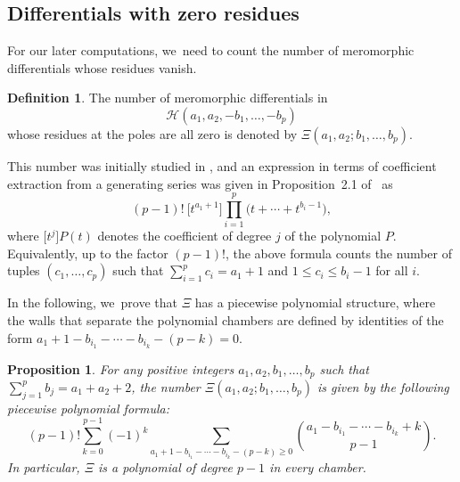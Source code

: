 \documentclass[JEP,XML,SOM,Unicode,NoFloatCountersInSection,published]{cedram}
\newcommand\calH{{\mathcal H}}
\newtheorem{prop}[thm]{Proposition}
\theoremstyle{definition}
\newtheorem{defn}[thm]{Definition}
\begin{document}
\subsection{Differentials with zero residues}\label{sub:counting}

For our later computations, we~need to count the number of meromorphic differentials whose residues vanish.
\begin{defn}\label{def:residuless}
The number of meromorphic differentials in
\[
\calH(a_{1},a_{2},-b_{1},\dots,-b_{p})
\]
whose residues at the poles are all zero is denoted by $\Xi(a_{1},a_{2};b_{1},\dots,b_{p})$.
\end{defn}
This number was initially studied in \cite{EMZ}, and an expression in terms of coefficient extraction from a generating series was given in Proposition~2.1 of \cite{CMSZ}~as
\[
(p-1)!\ \big[t^{a_1+1}\big]\prod_{i=1}^p \big(t + \cdots + t^{b_i-1}\big),
\]
where $\big[t^{j}\big]P(t)$ denotes the coefficient of degree $j$ of the polynomial $P$.
Equivalently, up to the factor $(p-1)!$, the above formula
counts the number of tuples $(c_1, \ldots, c_p)$ such that
$\sum_{i=1}^p c_i = a_1 + 1$ and $1\leq c_i\leq b_i-1$ for all $i$.

In the following, we~prove that $\Xi$ has a piecewise polynomial structure, where the walls that separate the polynomial chambers are defined by identities of the form $a_1+1-b_{i_1}-\cdots -b_{i_k}-(p-k)= 0$.

\begin{prop}\label{prop:residueless}
For any positive integers $a_{1},a_{2},b_{1},\dots,b_{p}$ such that $\sum_{j=1}^p b_j = a_{1}+a_{2}+2$, the number $\Xi(a_{1},a_{2};b_{1},\dots,b_{p})$ is given by the following piecewise polynomial formula:
\begin{equation}
\label{eqn:residueless}
(p-1)!\sum_{k=0}^{p-1} (-1)^k \sum_{a_1+1-b_{i_1}-\cdots -b_{i_k}-(p-k)\geq 0} \binom{a_1-b_{i_1}-\cdots-b_{i_k}+k}{p-1}.
\end{equation}
In particular, $\Xi$ is a polynomial of degree $p-1$ in every chamber.
\end{prop}
\end{document}
